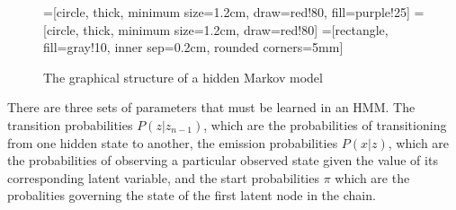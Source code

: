 \documentclass[11pt,a4paper,twocolumn]{article}
\begin{document}
\begin{figure}[htbp]
\centering
{}=[circle, thick, minimum size=1.2cm, draw=red!80, fill=purple!25]
=[circle, thick, minimum size=1.2cm, draw=red!80]
=[rectangle,
                                                fill=gray!10,
                                                inner sep=0.2cm,
                                                rounded corners=5mm]

\caption{The graphical structure of a hidden Markov model}
\end{figure}

There are three sets of parameters that must be learned in an HMM\@. The transition probabilities
$P(z | z_{n-1})$, which are the probabilities of transitioning from one hidden state to another,
the emission probabilities $P(x | z)$, which are the probabilities of observing a particular observed state
given the value of its corresponding latent variable, and the start probabilities $\pi$ which are the probalities
governing the state of the first latent node in the chain.
\end{document}
